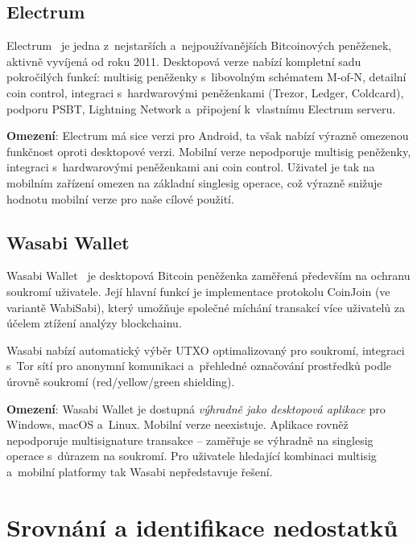 \subsection{Electrum}
\label{sec:electrum}

Electrum~\citep{Electrum} je jedna z~nejstarších a~nejpoužívanějších
Bitcoinových peněženek, aktivně vyvíjená od roku 2011. Desktopová verze nabízí
kompletní sadu pokročilých funkcí: multisig peněženky s~libovolným schématem
M-of-N, detailní coin control, integraci s~hardwarovými peněženkami (Trezor,
Ledger, Coldcard), podporu PSBT, Lightning Network a~připojení k~vlastnímu
Electrum serveru.

\textbf{Omezení}: Electrum má sice verzi pro Android, ta však nabízí výrazně
omezenou funkčnost oproti desktopové verzi. Mobilní verze nepodporuje multisig
peněženky, integraci s~hardwarovými peněženkami ani coin control. Uživatel je
tak na mobilním zařízení omezen na základní singlesig operace, což výrazně
snižuje hodnotu mobilní verze pro naše cílové použití.

\subsection{Wasabi Wallet}
\label{sec:wasabi}

Wasabi Wallet~\citep{WasabiWallet} je desktopová Bitcoin peněženka zaměřená
především na ochranu soukromí uživatele. Její hlavní funkcí je implementace
protokolu CoinJoin (ve variantě WabiSabi), který umožňuje společné míchání
transakcí více uživatelů za účelem ztížení analýzy blockchainu.

Wasabi nabízí automatický výběr UTXO optimalizovaný pro soukromí, integraci
s~Tor sítí pro anonymní komunikaci a~přehledné označování prostředků podle
úrovně soukromí (red/yellow/green shielding).

\textbf{Omezení}: Wasabi Wallet je dostupná \emph{výhradně jako desktopová
aplikace} pro Windows, macOS a~Linux. Mobilní verze neexistuje. Aplikace rovněž
nepodporuje multisignature transakce -- zaměřuje se výhradně na singlesig
operace s~důrazem na soukromí. Pro uživatele hledající kombinaci multisig
a~mobilní platformy tak Wasabi nepředstavuje řešení.


\section{Srovnání a identifikace nedostatků}
\label{sec:comparison}

